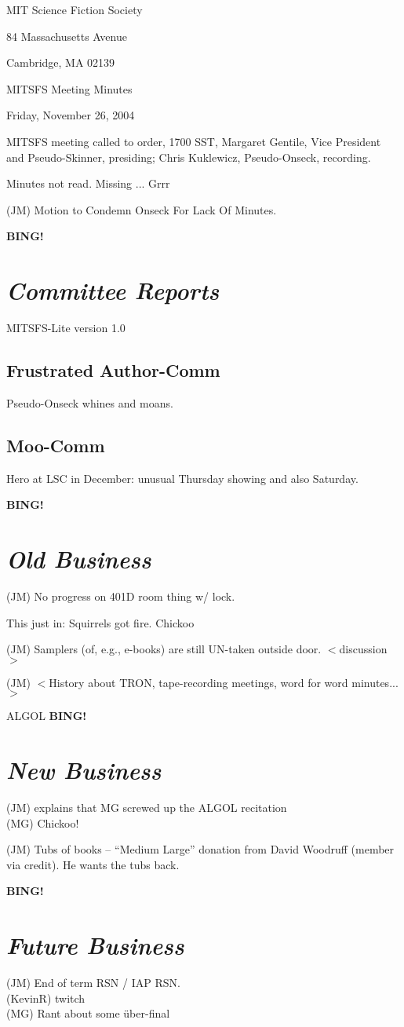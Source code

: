 \documentclass[10pt]{article}
\newcommand{\bing}{{\bf BING!} }
\newcommand{\goto}[1]{\bing \vskip 12pt \section*{{\em{#1}}}}
\begin{document}
\begin{center}

MIT Science Fiction Society

84 Massachusetts Avenue

Cambridge, MA 02139

\vspace{12pt}

MITSFS Meeting Minutes

Friday, November 26, 2004

\end{center}

\vspace{18pt}

\setlength{\parskip}{6pt}

\noindent
MITSFS meeting called to order, 1700 SST, Margaret Gentile, Vice President and
Pseudo-Skinner, presiding; Chris Kuklewicz,  Pseudo-Onseck, recording.

Minutes not read. Missing ... Grrr

(JM) Motion to Condemn Onseck For Lack Of Minutes.

\goto{Committee Reports}
MITSFS-Lite version 1.0
\subsection*{Frustrated Author-Comm}
Pseudo-Onseck whines and moans.
\subsection*{Moo-Comm}
Hero at LSC in December: unusual Thursday showing and also Saturday.

\goto{Old Business}
(JM) No progress on 401D room thing w/ lock.

This just in: Squirrels got fire.
Chickoo

(JM) Samplers (of, e.g., e-books) are still UN-taken outside door.
$<$discussion$>$

(JM) $<$History about TRON, tape-recording meetings, word for word minutes...$>$

ALGOL
\goto{New Business}
(JM) explains that MG screwed up the ALGOL recitation\\
(MG) Chickoo!

(JM) Tubs of books -- ``Medium Large'' donation from David Woodruff (member via
credit).  He wants the tubs back.

\goto{Future Business}

(JM) End of term RSN / IAP RSN.\\
(KevinR) twitch\\
(MG) Rant about some \"{u}ber-final
\end{document}
